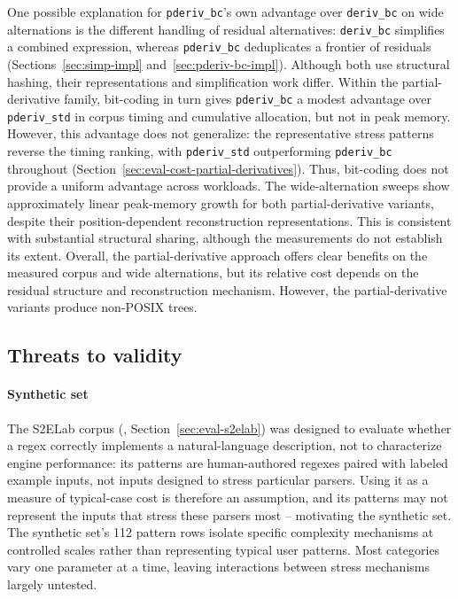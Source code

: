 One possible explanation for \texttt{pderiv\_bc}'s
own advantage over \texttt{deriv\_bc} on wide
alternations is the different handling of residual
alternatives: \texttt{deriv\_bc} simplifies a
combined expression, whereas \texttt{pderiv\_bc}
deduplicates a frontier of residuals
(Sections~\ref{sec:simp-impl}
and~\ref{sec:pderiv-bc-impl}).
Although both use structural hashing,
their representations and simplification
work differ.
Within the partial-derivative family,
bit-coding in turn gives \texttt{pderiv\_bc}
a modest advantage over \texttt{pderiv\_std}
in corpus timing and cumulative allocation,
but not in peak memory.
However, this advantage does not generalize:
the representative stress patterns reverse the
timing ranking, with \texttt{pderiv\_std}
outperforming \texttt{pderiv\_bc} throughout
(Section~\ref{sec:eval-cost-partial-derivatives}).
Thus, bit-coding does not provide
a uniform advantage across workloads.
The wide-alternation sweeps show
approximately linear peak-memory growth
for both partial-derivative variants,
despite their position-dependent
reconstruction representations.
This is consistent with substantial
structural sharing, although the
measurements do not establish its extent.
Overall, the partial-derivative approach
offers clear benefits on the measured corpus
and wide alternations, but its relative
cost depends on the residual structure
and reconstruction mechanism.
However, the partial-derivative variants
produce non-POSIX trees. 

%
%
%

\subsection{Threats to validity}

\paragraph{Synthetic set}
The S2ELab corpus (\citet{s2elab-regexeval-dataset},
Section~\ref{sec:eval-s2elab}) was designed to evaluate whether
a regex correctly implements a natural-language description,
not to characterize engine performance: its patterns are
human-authored regexes paired with labeled example inputs,
not inputs designed to stress particular parsers.
Using it as a measure of typical-case cost is therefore an
assumption, and its patterns may not represent the inputs
that stress these parsers most -- motivating the synthetic set.
The synthetic set's 112 pattern rows isolate specific complexity
mechanisms at controlled scales rather than representing typical
user patterns. Most categories vary one parameter at a time,
leaving interactions between stress mechanisms largely untested.

